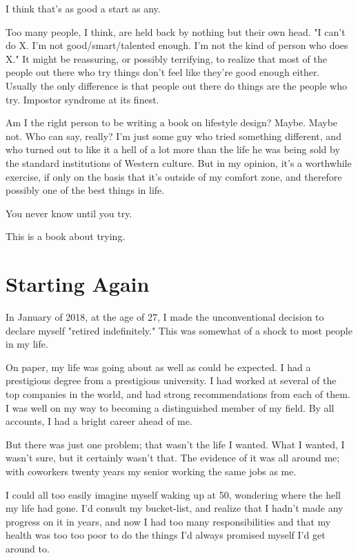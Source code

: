 \documentclass[]{book}
\begin{document}
I think that's as good a start as any.

Too many people, I think, are held back by nothing but their own head. "I can't
do X. I'm not good/smart/talented enough. I'm not the kind of person who does
X." It might be reassuring, or possibly terrifying, to realize that most of the
people out there who try things don't feel like they're good enough either.
Usually the only difference is that people out there do things are the people
who try. Impostor syndrome at its finest.

Am I the right person to be writing a book on lifestyle design? Maybe. Maybe
not. Who can say, really? I'm just some guy who tried something different, and
who turned out to like it a hell of a lot more than the life he was being sold
by the standard institutions of Western culture. But in my opinion, it's a
worthwhile exercise, if only on the basis that it's outside of my comfort zone,
and therefore possibly one of the best things in life.

You never know until you try.

This is a book about trying.


\chapter{Starting Again}

In January of 2018, at the age of 27, I made the unconventional decision to
declare myself "retired indefinitely." This was somewhat of a shock to most
people in my life.

On paper, my life was going about as well as could be expected. I had a
prestigious degree from a prestigious university. I had worked at several of the
top companies in the world, and had strong recommendations from each of them. I
was well on my way to becoming a distinguished member of my field. By all
accounts, I had a bright career ahead of me.

But there was just one problem; that wasn't the life I wanted. What I wanted, I
wasn't sure, but it certainly wasn't that. The evidence of it was all around me;
with coworkers twenty years my senior working the same jobs as me.

I could all too easily imagine myself waking up at 50, wondering where the hell
my life had gone. I'd consult my bucket-list, and realize that I hadn't made any
progress on it in years, and now I had too many responsibilities and that my
health was too too poor to do the things I'd always promised myself I'd get
around to.
\end{document}
